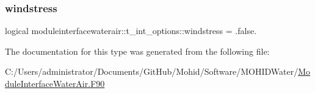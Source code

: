 \subsubsection{\texorpdfstring{windstress}{windstress}}
{\footnotesize\ttfamily logical moduleinterfacewaterair\+::t\+\_\+int\+\_\+options\+::windstress = .false.\hspace{0.3cm}{\ttfamily [private]}}



The documentation for this type was generated from the following file\+:\begin{DoxyCompactItemize}
\item 
C\+:/\+Users/administrator/\+Documents/\+Git\+Hub/\+Mohid/\+Software/\+M\+O\+H\+I\+D\+Water/\mbox{\hyperlink{_module_interface_water_air_8_f90}{Module\+Interface\+Water\+Air.\+F90}}\end{DoxyCompactItemize}
